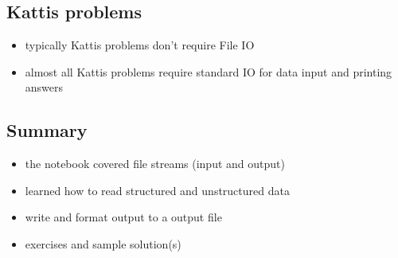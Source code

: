 \documentclass[11pt]{article}
\makeatletter
\providecommand{\tightlist}{%
      \setlength{\itemsep}{0pt}\setlength{\parskip}{0pt}}
\newcommand{\boxspacing}{\kern\kvtcb@left@rule\kern\kvtcb@boxsep}
\newcommand{\prompt}[4]{
        {\ttfamily\llap{{\color{#2}[#3]:\hspace{3pt}#4}}\vspace{-\baselineskip}}
    }
\makeatother
\begin{document}
    \hypertarget{kattis-problems}{%
\subsection{Kattis problems}\label{kattis-problems}}

\begin{itemize}
\tightlist
\item
  typically Kattis problems don't require File IO
\item
  almost all Kattis problems require standard IO for data input and
  printing answers
\end{itemize}

    \hypertarget{summary}{%
\subsection{Summary}\label{summary}}

\begin{itemize}
\tightlist
\item
  the notebook covered file streams (input and output)
\item
  learned how to read structured and unstructured data
\item
  write and format output to a output file
\item
  exercises and sample solution(s)
\end{itemize}

    \begin{tcolorbox}[breakable, size=fbox, boxrule=1pt, pad at break*=1mm,colback=cellbackground, colframe=cellborder]
\prompt{In}{incolor}{ }{\boxspacing}
\begin{Verbatim}[commandchars=\\\{\}]

\end{Verbatim}
\end{tcolorbox}


    
    
    
\end{document}
